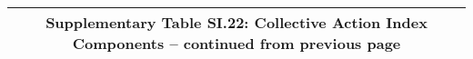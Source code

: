 \begin{longtable}{llcccccccccc}
\multicolumn{12}{c}{{\bfseries Supplementary Table SI.22: Collective Action Index Components -- continued from previous page}} \\ \hline                                                                                                                                                                                                                                                                                                                                                                                                                                                                                                                                                                                                                                                                                                                                                  

\end{longtable}
